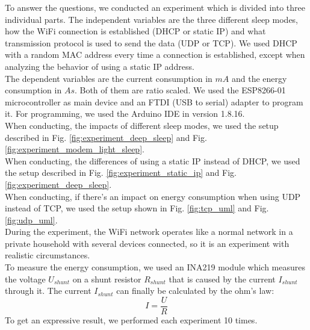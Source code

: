 To answer the questions, we conducted an experiment which is divided into three individual parts.
The independent variables are the three different sleep modes, how the WiFi connection is established (DHCP or static IP) and what transmission protocol is used to send the data (UDP or TCP).
We used DHCP with a random MAC address every time a connection is established, except when analyzing the behavior of using a static IP address.\\
The dependent variables are the current consumption in $mA$ and the energy consumption in $As$. Both of them are ratio scaled.
We used the ESP8266-01 microcontroller as main device and an FTDI (USB to serial) adapter to program it. 
For programming, we used the Arduino IDE in version 1.8.16.\\
When conducting, the impacts of different sleep modes, we used the setup described in Fig. \ref{fig:experiment_deep_sleep} and Fig. \ref{fig:experiment_modem_light_sleep}.\\
When conducting, the differences of using a static IP instead of DHCP, we used the setup described in Fig. \ref{fig:experiment_static_ip} and Fig. \ref{fig:experiment_deep_sleep}.\\
When conducting, if there's an impact on energy consumption when using UDP instead of TCP, we used the setup shown in Fig. \ref{fig:tcp_uml} and Fig. \ref{fig:udp_uml}.\\
During the experiment, the WiFi network operates like a normal network in a private household with several devices connected, so it is an experiment with realistic circumstances.\\

To measure the energy consumption, we used an INA219 module which measures the voltage $U_{shunt}$ on a shunt resistor $R_{shunt}$ that is caused by the current $I_{shunt}$ through it.
The current $I_{shunt}$ can finally be calculated by the ohm's law:
\begin{equation*}
    I = \frac{U}{R}
\end{equation*}
To get an expressive result, we performed each experiment 10 times.





